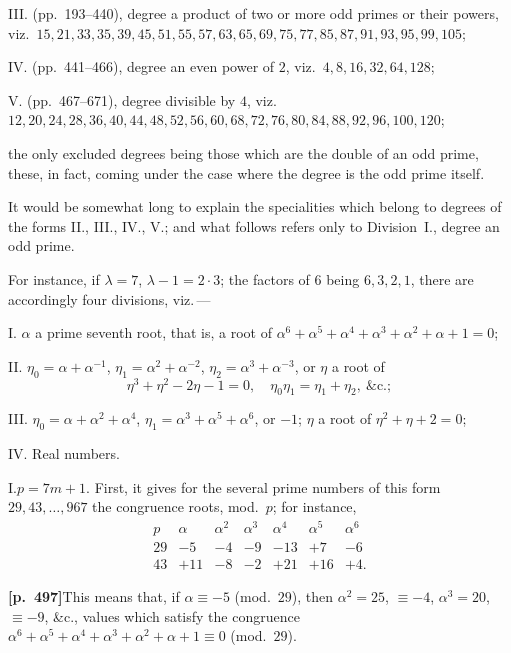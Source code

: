 \documentclass[11pt,a4paper]{article}
\begin{document}
III. (pp.~193--440), degree a product of two or more odd primes or their powers, viz.\ $15, 21, 33, 35, 39, 45, 51, 55, 57, 63, 65, 69, 75, 77, 85, 87, 91, 93, 95, 99, 105$;

IV. (pp.~441--466), degree an even power of $2$, viz.\ $4, 8, 16, 32, 64, 128$;

V. (pp.~467--671), degree divisible by $4$, viz.\ $12, 20, 24, 28, 36, 40, 44, 48, 52, 56, 60, 68, 72, 76, 80, 84, 88, 92, 96, 100, 120$;

the only excluded degrees being those which are the double of an odd prime, these, in fact, coming under the case where the degree is the odd prime itself.

It would be somewhat long to explain the specialities which belong to degrees of the forms II., III., IV., V.; and what follows refers only to Division~I., degree an odd prime.

For instance, if $\lambda = 7$, $\lambda - 1 = 2 \cdot 3$; the factors of $6$ being $6, 3, 2, 1$, there are accordingly four divisions, viz.\,---

I. $\alpha$ a prime seventh root, that is, a root of $\alpha^{6} + \alpha^{5} + \alpha^{4} + \alpha^{3} + \alpha^{2} + \alpha + 1 = 0$;

II. $\eta_{0} = \alpha + \alpha^{-1}$, $\eta_{1} = \alpha^{2} + \alpha^{-2}$, $\eta_{2} = \alpha^{3} + \alpha^{-3}$, or $\eta$ a root of
\[
\eta^{3} + \eta^{2} - 2\eta - 1 = 0,\quad \eta_{0}\eta_{1} = \eta_{1} + \eta_{2},\ \text{\&c.};
\]

III. $\eta_{0} = \alpha + \alpha^{2} + \alpha^{4}$, $\eta_{1} = \alpha^{3} + \alpha^{5} + \alpha^{6}$, or $-1$; $\eta$ a root of $\eta^{2} + \eta + 2 = 0$;

IV. Real numbers.

I.\quad $p = 7m + 1$. First, it gives for the several prime numbers of this form $29, 43, \ldots, 967$ the congruence roots, mod.~$p$; for instance,
\[
\begin{array}{c|cccccc}
p & \alpha & \alpha^{2} & \alpha^{3} & \alpha^{4} & \alpha^{5} & \alpha^{6} \\
\hline
29 & -5 & -4 & -9 & -13 & +7 & -6 \\
43 & +11 & -8 & -2 & +21 & +16 & +4 .
\end{array}
\]

\noindent\textbf{[p.~497]}\quad This means that, if $\alpha \equiv -5$ (mod.~$29$), then $\alpha^{2} = 25$, $\equiv -4$, $\alpha^{3} = 20$, $\equiv -9$, \&c., values which satisfy the congruence $\alpha^{6} + \alpha^{5} + \alpha^{4} + \alpha^{3} + \alpha^{2} + \alpha + 1 \equiv 0$ (mod.~$29$).
\end{document}
